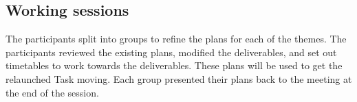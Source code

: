 \subsection{Working sessions}

The participants split into groups to refine the plans for each of the themes. The participants reviewed the existing plans, modified the deliverables, and set out timetables to work towards the deliverables. These plans will be used to get the relaunched Task moving. Each group presented their plans back to the meeting at the end of the session.